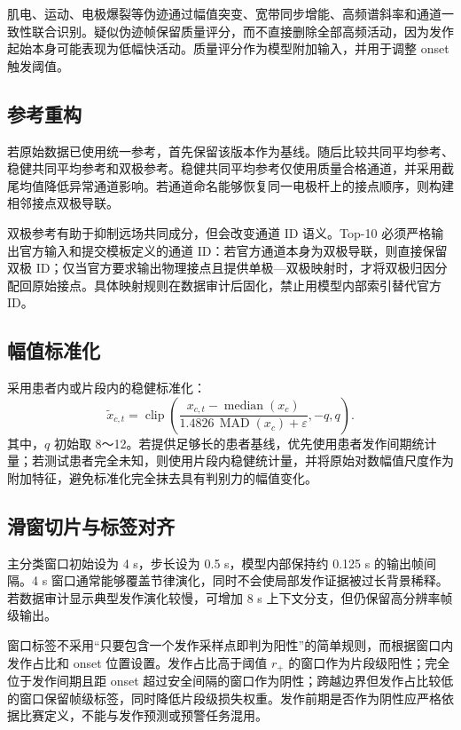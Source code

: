 \documentclass{cumcmthesis_v2}
\numberwithin{figure}{section} %
\numberwithin{table}{section} %
\begin{document}
肌电、运动、电极爆裂等伪迹通过幅值突变、宽带同步增能、高频谱斜率和通道一致性联合识别。疑似伪迹帧保留质量评分，而不直接删除全部高频活动，因为发作起始本身可能表现为低幅快活动。质量评分作为模型附加输入，并用于调整 onset 触发阈值。

\subsection{参考重构}
若原始数据已使用统一参考，首先保留该版本作为基线。随后比较共同平均参考、稳健共同平均参考和双极参考。稳健共同平均参考仅使用质量合格通道，并采用截尾均值降低异常通道影响。若通道命名能够恢复同一电极杆上的接点顺序，则构建相邻接点双极导联。

双极参考有助于抑制远场共同成分，但会改变通道 ID 语义。Top-10 必须严格输出官方输入和提交模板定义的通道 ID：若官方通道本身为双极导联，则直接保留双极 ID；仅当官方要求输出物理接点且提供单极—双极映射时，才将双极归因分配回原始接点。具体映射规则在数据审计后固化，禁止用模型内部索引替代官方 ID。

\subsection{幅值标准化}
采用患者内或片段内的稳健标准化：
\begin{equation*}
\tilde{x}_{c,t}
=
\operatorname{clip}\left(
\frac{
    x_{c,t}-\operatorname{median}(x_c)
}{
    1.4826\,\operatorname{MAD}(x_c)+\varepsilon
},
-q,q
\right).
\end{equation*}
其中，$q$ 初始取 8～12。若提供足够长的患者基线，优先使用患者发作间期统计量；若测试患者完全未知，则使用片段内稳健统计量，并将原始对数幅值尺度作为附加特征，避免标准化完全抹去具有判别力的幅值变化。

\subsection{滑窗切片与标签对齐}

主分类窗口初始设为 4 s，步长设为 0.5 s，模型内部保持约 0.125 s 的输出帧间隔。4 s 窗口通常能够覆盖节律演化，同时不会使局部发作证据被过长背景稀释。若数据审计显示典型发作演化较慢，可增加 8 s 上下文分支，但仍保留高分辨率帧级输出。

窗口标签不采用“只要包含一个发作采样点即判为阳性”的简单规则，而根据窗口内发作占比和 onset 位置设置。发作占比高于阈值 $r_+$ 的窗口作为片段级阳性；完全位于发作间期且距 onset 超过安全间隔的窗口作为阴性；跨越边界但发作占比较低的窗口保留帧级标签，同时降低片段级损失权重。发作前期是否作为阴性应严格依据比赛定义，不能与发作预测或预警任务混用。
\end{document}
